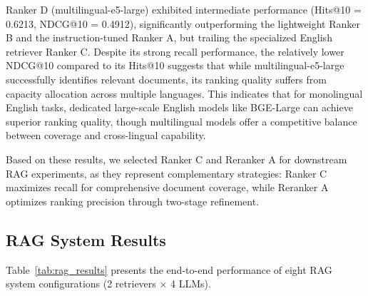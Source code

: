 \documentclass[10pt,twocolumn]{article}
\begin{document}
Ranker D (multilingual-e5-large) exhibited intermediate performance (Hits@10 = 0.6213, NDCG@10 = 0.4912), significantly outperforming the lightweight Ranker B and the instruction-tuned Ranker A, but trailing the specialized English retriever Ranker C. Despite its strong recall performance, the relatively lower NDCG@10 compared to its Hits@10 suggests that while multilingual-e5-large successfully identifies relevant documents, its ranking quality suffers from capacity allocation across multiple languages. This indicates that for monolingual English tasks, dedicated large-scale English models like BGE-Large can achieve superior ranking quality, though multilingual models offer a competitive balance between coverage and cross-lingual capability.

Based on these results, we selected Ranker C and Reranker A for downstream RAG experiments, as they represent complementary strategies: Ranker C maximizes recall for comprehensive document coverage, while Reranker A optimizes ranking precision through two-stage refinement.

\subsection{RAG System Results}

Table~\ref{tab:rag_results} presents the end-to-end performance of eight RAG system configurations (2 retrievers × 4 LLMs).
\end{document}
